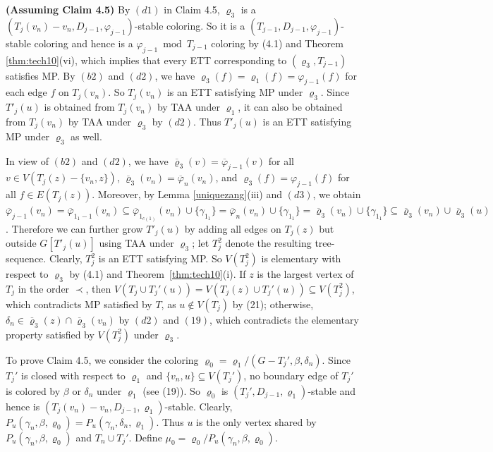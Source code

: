 \documentclass[11pt]{article}
\newcommand{\phibar}{\overline{\varphi}}
\newcommand{\phiv}{\varphi}
\begin{document}
{\bf (Assuming Claim 4.5)}  By $(d1)$ in Claim 4.5, $\varrho_3$ is a $(T_j(v_n)-v_n,D_{j-1},\varphi_{j-1})$-stable
coloring. So it is a $(T_{j-1},D_{j-1},\varphi_{j-1})$-stable coloring and hence is a $\phiv_{j-1}\bmod T_{j-1}$ coloring by
(4.1) and Theorem \ref{thm:tech10}(vi), which implies that every ETT corresponding to $(\varrho_3, T_{j-1})$ satisfies MP. By $(b2)$ and $(d2)$, 
we have $\varrho_3(f)=\varrho_1(f)=\varphi_{j-1}(f)$ for each edge $f$ on $T_j(v_n)$. So $T_j(v_n)$ is an ETT satisfying MP under 
$\varrho_3$. Since $T'_j(u)$ is obtained from $T_j(v_n)$ by TAA under $\varrho_1$, it can also be obtained from $T_j(v_n)$ by 
TAA under $\varrho_3$ by $(d2)$. Thus $T'_j(u)$ is an ETT satisfying MP under $\varrho_3$ as well. 

In view of $(b2)$ and $(d2)$, we have $\overline{\varrho}_3(v)=\phibar_{j-1}(v)$ for all $v\in V(T_j(z)-\{v_n,z\})$, $\overline{\varrho}_3(v_n)=
\overline{\varphi}_{n}(v_n)$, and $\varrho_3 (f)=\varphi_{j-1}(f)$ for all $f\in E(T_j(z))$. Moreover, by Lemma \ref{uniquezang}(iii) and $(d3)$, 
we obtain $\overline{\varphi}_{j-1}(v_n) =\overline{\varphi}_{1_1-1}(v_n)  \subseteq \overline{\varphi}_{1_{c(1)}}(v_n) \cup \{\gamma_{1_1}\} = 
\overline{\varphi}_{n}(v_n) \cup \{\gamma_{1_1}\}=\overline{\varrho}_3(v_n) \cup \{\gamma_{1_1}\} \subseteq \overline{\varrho}_3(v_n) \cup 
\overline{\varrho}_3(u)$. Therefore we can further grow $T'_j(u)$ by adding all edges on $T_j(z)$ but outside $G[T'_j(u)]$ using TAA under 
$\varrho_3$; let $T_j^2$ denote the resulting tree-sequence. Clearly, $T_j^2$ is an ETT satisfying MP. So $V(T_j^2)$ is elementary with respect to
$\varrho_3$ by (4.1) and Theorem~\ref{thm:tech10}(i). If $z$ is the largest vertex of $T_j$ in the order $\prec$, then
$V(T_j \cup T_j'(u))= V(T_j(z) \cup T_j'(u)) \subseteq V(T_j^2)$, which contradicts MP satisfied by $T$, as $u \notin V(T_j)$ by (21); otherwise,
$\delta_n\in \overline{\varrho}_3(z) \cap \overline{\varrho}_3(v_n)$ by $(d2)$ and $(19)$, which contradicts the elementary property
satisfied by $V(T_j^2)$ under $\varrho_3$. 

\vskip 2mm
To prove Claim 4.5, we consider the coloring $\varrho_0=\varrho_1/(G-T_j',\beta,\delta_n)$. Since $T_j'$ is closed with
respect to $\varrho_1$ and $\{v_n, u\} \subseteq V(T_j')$, no boundary edge of $T_j'$ is colored by $\beta$ or $\delta_n$ under $\varrho_1$ (see (19)). 
So $\varrho_0$ is $(T_j', D_{j-1}, \varrho_1)$-stable and hence is $(T_j(v_n)-v_n, D_{j-1}, \varrho_1)$-stable. Clearly, 
$P_u(\gamma_n, \beta, \varrho_0) = P_u(\gamma_n, \delta_n, \varrho_1)$.  Thus $u$ is the only vertex shared by $P_u(\gamma_n, \beta, \varrho_0)$
and $T_n \cup T_j'$. Define $\mu_0 = \varrho_0/P_u(\gamma_n, \beta, \varrho_0)$.  
\end{document}

